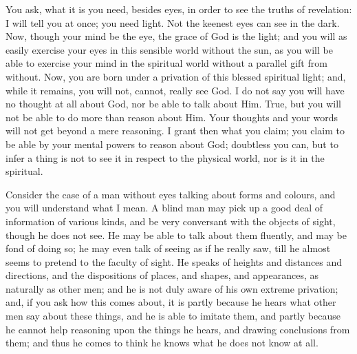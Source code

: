 You ask, what it is you need, besides eyes, in order to see the
truths of revelation: I will tell you at once; you need light. Not the
keenest eyes can see in the dark. Now, though your mind be the eye,
the grace of God is the light; and you will as easily exercise your
eyes in this sensible world without the sun, as you will be able to
exercise your mind in the spiritual world without a parallel gift from
without. Now, you are born under a privation of this blessed spiritual
light; and, while it remains, you will not, cannot, really see God. I
do not say you will have no thought at all about God, nor be able to
talk about Him. True, but you will not be able to do more than reason
about Him. Your thoughts and your words will not get beyond a mere
reasoning. I grant then what you claim; you claim to be able by your
mental powers to reason about God; doubtless you can, but to infer a
thing is not to see it in respect to the physical world, nor is it in
the spiritual.

Consider the case of a man without eyes talking about forms and
colours, and you will understand what I mean. A blind man may pick up
a good deal of information of various kinds, and be very conversant
with the objects of sight, though he does not see. He may be able to
talk about them fluently, and may be fond of doing so; he may even
talk of seeing as if he really saw, till he almost seems to pretend to
the faculty of sight. He speaks of heights and distances and
directions, and the dispositions of places, and shapes, and
appearances, as naturally as other men; and he is not duly aware of his
own extreme privation; and, if you ask how this comes about, it is
partly because he hears what other men say about these things, and he
is able to imitate them, and partly because he cannot help reasoning
upon the things he hears, and drawing conclusions from them; and thus
he comes to think he knows what he does not know at all.

